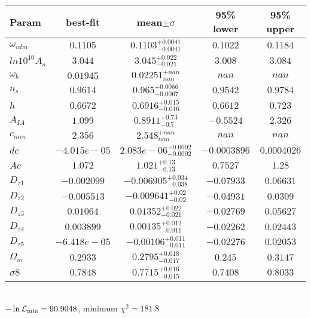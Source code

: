 \begin{tabular}{|l|c|c|c|c|} 
 \hline 
Param & best-fit & mean$\pm\sigma$ & 95\% lower & 95\% upper \\ \hline 
$\omega_{cdm }$ &$0.1105$ & $0.1103_{-0.0041}^{+0.0041}$ & $0.1022$ & $0.1184$ \\ 
$ln10^{10}A_{s }$ &$3.044$ & $3.045_{-0.021}^{+0.022}$ & $3.008$ & $3.084$ \\ 
$\omega_{b }$ &$0.01945$ & $0.02251_{nan}^{+nan}$ & $nan$ & $nan$ \\ 
$n_{s }$ &$0.9614$ & $0.965_{-0.0067}^{+0.0056}$ & $0.9542$ & $0.9784$ \\ 
$h$ &$0.6672$ & $0.6916_{-0.016}^{+0.015}$ & $0.6612$ & $0.723$ \\ 
$A_{IA }$ &$1.099$ & $0.8911_{-0.7}^{+0.73}$ & $-0.5524$ & $2.326$ \\ 
$c_{min }$ &$2.356$ & $2.548_{nan}^{+nan}$ & $nan$ & $nan$ \\ 
$dc$ &$-4.015e-05$ & $2.083e-06_{-0.0002}^{+0.0002}$ & $-0.0003896$ & $0.0004026$ \\ 
$Ac$ &$1.072$ & $1.021_{-0.13}^{+0.13}$ & $0.7527$ & $1.28$ \\ 
$D_{z1 }$ &$-0.002099$ & $-0.006905_{-0.038}^{+0.034}$ & $-0.07933$ & $0.06631$ \\ 
$D_{z2 }$ &$-0.005513$ & $-0.009641_{-0.02}^{+0.02}$ & $-0.04931$ & $0.0309$ \\ 
$D_{z3 }$ &$0.01064$ & $0.01352_{-0.021}^{+0.022}$ & $-0.02769$ & $0.05627$ \\ 
$D_{z4 }$ &$0.003899$ & $0.00135_{-0.011}^{+0.012}$ & $-0.02262$ & $0.02443$ \\ 
$D_{z5 }$ &$-6.418e-05$ & $-0.00106_{-0.011}^{+0.011}$ & $-0.02276$ & $0.02053$ \\ 
$\Omega_{m }$ &$0.2933$ & $0.2795_{-0.017}^{+0.018}$ & $0.245$ & $0.3147$ \\ 
$\sigma8$ &$0.7848$ & $0.7715_{-0.015}^{+0.016}$ & $0.7408$ & $0.8033$ \\ 
\hline 
 \end{tabular} \\ 
$-\ln{\cal L}_\mathrm{min} =90.9048$, minimum $\chi^2=181.8$ \\ 
